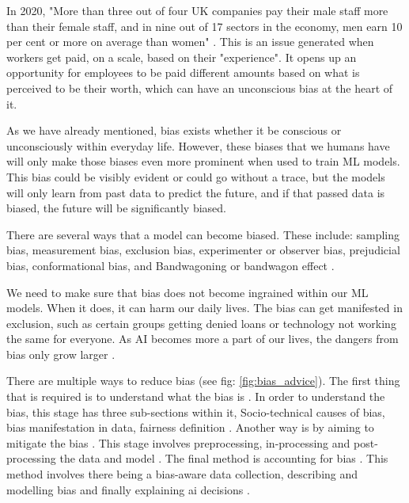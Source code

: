 \documentclass{sigchi}
\begin{document}
	
	In 2020, "More than three out of four UK companies pay their male staff more than their female staff, and in nine out of 17 sectors in the economy, men earn 10 per cent or more on average than women" \cite{gender_pay_FT}. This is an issue generated when workers get paid, on a scale, based on their "experience". It opens up an opportunity for employees to be paid different amounts based on what is perceived to be their worth, which can have an unconscious bias at the heart of it. %
	
	As we have already mentioned, bias exists whether it be conscious or unconsciously within everyday life. However, these biases that we humans have will only make those biases even more prominent when used to train ML models. This bias could be visibly evident or could go without a trace, but the models will only learn from past data to predict the future, and if that passed data is biased, the future will be significantly biased.
	
	There are several ways that a model can become biased. These include: sampling bias, measurement bias, exclusion bias, experimenter or observer bias, prejudicial bias, conformational bias, and Bandwagoning or bandwagon effect \cite{6_ways_bias}. 
	
	We need to make sure that bias does not become ingrained within our ML models. When it does, it can harm our daily lives. The bias can get manifested in exclusion, such as certain groups getting denied loans or technology not working the same for everyone. As AI becomes more a part of our lives, the dangers from bias only grow larger \cite{6_ways_bias}.
	
	There are multiple ways to reduce bias (see fig: \ref{fig:bias_advice}). The first thing that is required is to understand what the bias is \cite{three}. In order to understand the bias, this stage has three sub-sections within it, Socio-technical causes of bias, bias manifestation in data, fairness definition \cite{three}. Another way is by aiming to mitigate the bias \cite{three}. This stage involves preprocessing, in-processing and post-processing the data and model \cite{three}. The final method is accounting for bias \cite{three}. This method involves there being a bias-aware data collection, describing and modelling bias and finally explaining ai decisions \cite{three}. 
	
\end{document}
